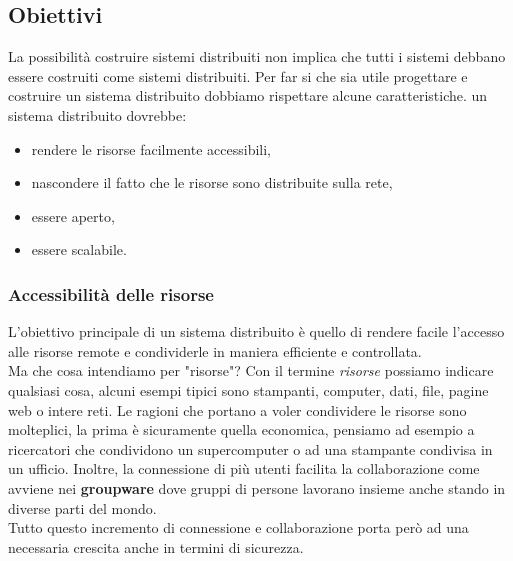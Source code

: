 \subsection{Obiettivi}
La possibilità costruire sistemi distribuiti non implica che tutti i sistemi debbano essere costruiti come sistemi distribuiti. Per far si che sia utile progettare e costruire un sistema distribuito dobbiamo rispettare alcune caratteristiche. un sistema distribuito dovrebbe:
\begin{itemize}
\item rendere le risorse facilmente accessibili,
\item nascondere il fatto che le risorse sono distribuite sulla rete,
\item essere aperto,
\item essere scalabile.
\end{itemize}
\subsubsection{Accessibilità delle risorse}
L'obiettivo principale di un sistema distribuito è quello di rendere facile l'accesso alle risorse remote e condividerle in maniera efficiente e controllata.\\
Ma che cosa intendiamo per "risorse"? Con il termine \emph{risorse} possiamo indicare qualsiasi cosa, alcuni esempi tipici sono stampanti, computer, dati, file, pagine web o intere reti.
Le ragioni che portano a voler condividere le risorse sono molteplici, la prima è sicuramente quella economica, pensiamo ad esempio a ricercatori che condividono un supercomputer o ad una stampante condivisa in un ufficio. Inoltre, la connessione di più utenti facilita la collaborazione come avviene nei \textbf{groupware} dove gruppi di persone lavorano insieme anche stando in diverse parti del mondo.\\
Tutto questo incremento di connessione e collaborazione porta però ad una necessaria crescita anche in termini di sicurezza.